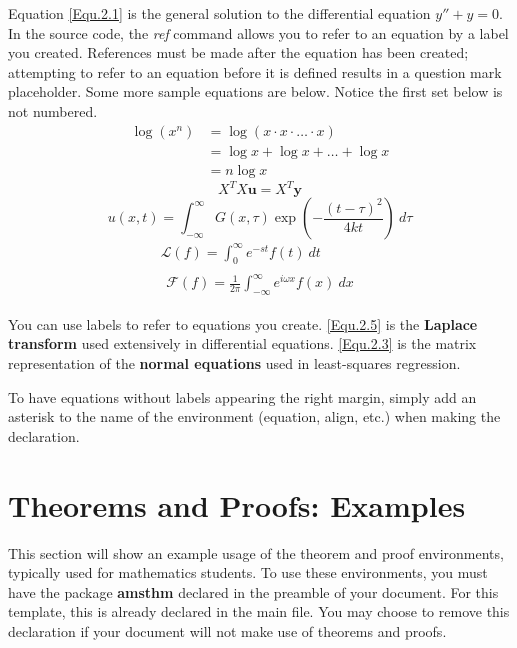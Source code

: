Equation \ref{Equ.2.1} is the general solution to the differential equation $y''+y=0$. In the source code, the \textit{ref} command allows you to refer to an equation by a label you created. References must be made after the equation has been created; attempting to refer to an equation before it is defined results in a question mark placeholder. Some more sample equations are below. Notice the first set below is not numbered.
\begin{align*}
	\log (x^n) 	&= \log (x \cdot x \cdot \ldots \cdot x) \\
				&= \log x + \log x + \ldots + \log x \\
				&= n \log x
\end{align*}
\begin{equation} \label{Equ.2.3}
	X^T X \mathbf{u} = X^T \mathbf{y}
\end{equation}
\begin{equation}\label{Equ.2.4}
	u(x, t) = \int_{-\infty}^{\infty} G(x, \tau) \exp\left(-\frac{(t-\tau)^2}{4kt}\right) \ d\tau
\end{equation}
\begin{gather}
	\mathcal{L}(f) = \int_{0}^{\infty} e^{-st} f(t) \ dt \\
	\begin{split} \label{Equ.2.5}
		\mathcal{F}(f) = \frac{1}{2\pi}\int_{-\infty}^{\infty} e^{i \omega x} f(x) \ dx
	\end{split}
\end{gather}

You can use labels to refer to equations you create. \ref{Equ.2.5} is the \textbf{Laplace transform} used extensively in differential equations. \ref{Equ.2.3} is the matrix representation of the \textbf{normal equations} used in least-squares regression.

To have equations without labels appearing the right margin, simply add an asterisk to the name of the environment (equation, align, etc.) when making the declaration.


\section{Theorems and Proofs: Examples}

This section will show an example usage of the theorem and proof environments, typically used for mathematics students. To use these environments, you must have the package \textbf{amsthm} declared in the preamble of your document. For this template, this is already declared in the main file. You may choose to remove this declaration if your document will not make use of theorems and proofs.

